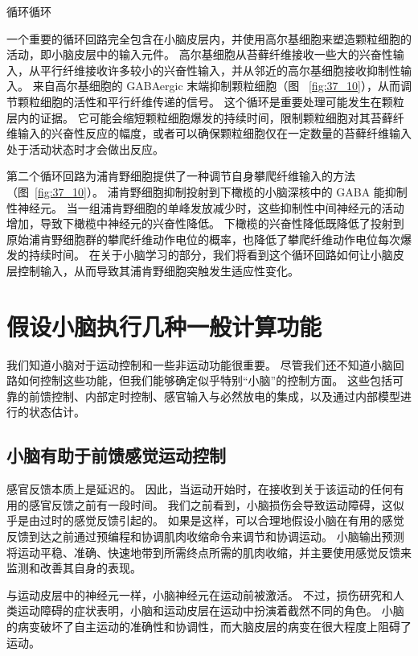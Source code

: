 循环循环

一个重要的循环回路完全包含在小脑皮层内，并使用高尔基细胞来塑造颗粒细胞的活动，即小脑皮层中的输入元件。
高尔基细胞从苔藓纤维接收一些大的兴奋性输入，从平行纤维接收许多较小的兴奋性输入，并从邻近的高尔基细胞接收抑制性输入。
来自高尔基细胞的 GABAergic 末端抑制颗粒细胞（图 ~\ref{fig:37_10}），从而调节颗粒细胞的活性和平行纤维传递的信号。
这个循环是重要处理可能发生在颗粒层内的证据。
它可能会缩短颗粒细胞爆发的持续时间，限制颗粒细胞对其苔藓纤维输入的兴奋性反应的幅度，或者可以确保颗粒细胞仅在一定数量的苔藓纤维输入处于活动状态时才会做出反应。


第二个循环回路为浦肯野细胞提供了一种调节自身攀爬纤维输入的方法（图~\ref{fig:37_10}）。
浦肯野细胞抑制投射到下橄榄的小脑深核中的 GABA 能抑制性神经元。
当一组浦肯野细胞的单峰发放减少时，这些抑制性中间神经元的活动增加，导致下橄榄中神经元的兴奋性降低。
下橄榄的兴奋性降低既降低了投射到原始浦肯野细胞群的攀爬纤维动作电位的概率，也降低了攀爬纤维动作电位每次爆发的持续时间。
在关于小脑学习的部分，我们将看到这个循环回路如何让小脑皮层控制输入，从而导致其浦肯野细胞突触发生适应性变化。



\section{假设小脑执行几种一般计算功能}

我们知道小脑对于运动控制和一些非运动功能很重要。
尽管我们还不知道小脑回路如何控制这些功能，但我们能够确定似乎特别“小脑”的控制方面。
这些包括可靠的前馈控制、内部定时控制、感官输入与必然放电的集成，以及通过内部模型进行的状态估计。



\subsection{小脑有助于前馈感觉运动控制}

感官反馈本质上是延迟的。
因此，当运动开始时，在接收到关于该运动的任何有用的感官反馈之前有一段时间。
我们之前看到，小脑损伤会导致运动障碍，这似乎是由过时的感觉反馈引起的。
如果是这样，可以合理地假设小脑在有用的感觉反馈到达之前通过预编程和协调肌肉收缩命令来调节和协调运动。
小脑输出预测将运动平稳、准确、快速地带到所需终点所需的肌肉收缩，并主要使用感觉反馈来监测和改善其自身的表现。


与运动皮层中的神经元一样，小脑神经元在运动前被激活。
不过，损伤研究和人类运动障碍的症状表明，小脑和运动皮层在运动中扮演着截然不同的角色。
小脑的病变破坏了自主运动的准确性和协调性，而大脑皮层的病变在很大程度上阻碍了运动。


